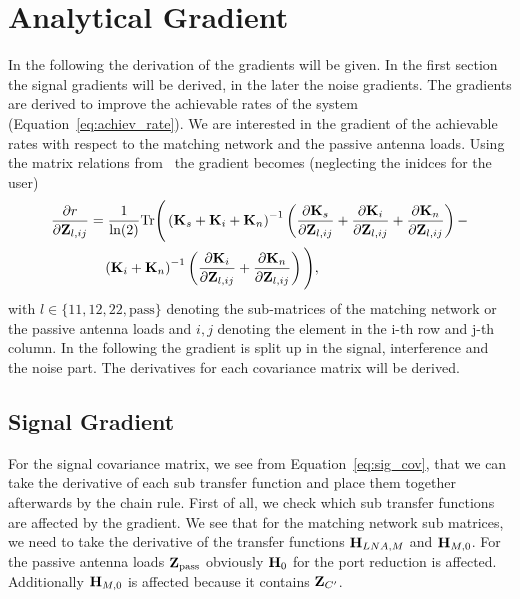 \chapter{Analytical Gradient}

In the following the derivation of the gradients will be given.
In the first section the signal gradients will be derived, in the later the noise gradients.
The gradients are derived to improve the achievable rates of the system (Equation~\eqref{eq:achiev_rate}).
We are interested in the gradient of the achievable rates with respect to the matching network and the passive antenna loads.
Using the matrix relations from~\cite{Codebook12} the gradient becomes (neglecting the inidces for the user)
\begin{align}
\label{eq:gradient}\nonumber
\frac{\partial r}{\partial\mathbf{Z}_{l,ij}} &= \frac{1}{\text{ln}(2)} 
\text{Tr}\Bigg(\left(\mathbf{K}_s + \mathbf{K}_i + \mathbf{K}_n\right)^{-1}
\left(\frac{\partial\mathbf{K}_s}{\partial\mathbf{Z}_{l,ij}}+
 \frac{\partial\mathbf{K}_i}{\partial\mathbf{Z}_{l,ij}}+
 \frac{\partial\mathbf{K}_n}{\partial\mathbf{Z}_{l,ij}}\right)-\\
 &\quad\left(\mathbf{K}_i+\mathbf{K}_n\right)^{-1}
 \left(\frac{\partial\mathbf{K}_i}{\partial\mathbf{Z}_{l,ij}}+
 	\frac{\partial\mathbf{K}_n}{\partial\mathbf{Z}_{l,ij}}\right)\Bigg),
\end{align}
with $l\in\{11,12,22,\text{pass}\}$ denoting the sub-matrices of the matching network or the passive antenna loads and $i,j$ denoting the element in the i-th row and j-th column.
In the following the gradient is split up in the signal, interference and the noise part.
The derivatives for each covariance matrix will be derived.

\section{Signal Gradient}
\label{sec:signal_gradient}
 For the signal covariance matrix, we see from Equation~\eqref{eq:sig_cov}, that we can take the derivative of each sub transfer function and place them together afterwards by the chain rule.
First of all, we check which sub transfer functions are affected by the gradient.
We see that for the matching network sub matrices, we need to take the derivative of the transfer functions $\mathbf{H}_{LNA,M}$ and $\mathbf{H}_{M,0}$.
For the passive antenna loads $\mathbf{Z}_\text{pass}$ obviously $\mathbf{H}_{0}$ for the port reduction is affected.
Additionally $\mathbf{H}_{M,0}$ is affected because it contains $\mathbf{Z}_{C'}$.

